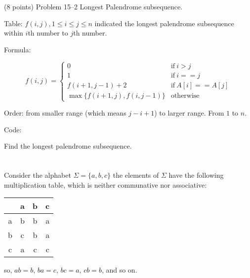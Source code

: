 \documentclass[paper=a4, fontsize=11pt]{scrartcl} %
\begin{document}
\begin{fancyquotes}
  (8 points) Problem 15--2 Longest Palendrome subsequence.
\end{fancyquotes}

Table: $f(i,j), 1\leq i\leq j\leq n$ indicated the longest palendrome
subsequence within $i$th number to $j$th number.

Formula:

\begin{equation*}
  f(i,j)=
  \begin{cases}
    0 & \text{if}\ i>j\\
    1 & \text{if}\ i==j\\
    f(i+1,j-1)+2 & \text{if}\ A[i]==A[j]\\
    \max\{f(i+1,j), f(i,j-1)\} & \text{otherwise}
  \end{cases}
\end{equation*}

Order: from smaller range (which means $j-i+1$) to larger range. From
$1$ to $n$.

Code:

\begin{algorithm}[H]
  \caption{Find the longest palendrome subsequence.}
\end{algorithm}

\pagebreak

\section{}

\begin{fancyquotes}
  Consider the alphabet $\Sigma = \{a,b,c\}$ the elements of $\Sigma$
  have the following multiplication table, which is neither
  communative nor associative:

  \begin{tabular}[c]{|c|c|c|c|}
    \hline
    & a & b & c \\
    \hline
    a & b & b & a \\
    \hline
    b & c & b & a \\
    \hline
    c & a & c & c \\
    \hline
  \end{tabular}

  so, $ab = b$, $ba = c$, $bc = a$, $cb = b$, and so on.
\end{fancyquotes}
\end{document}
